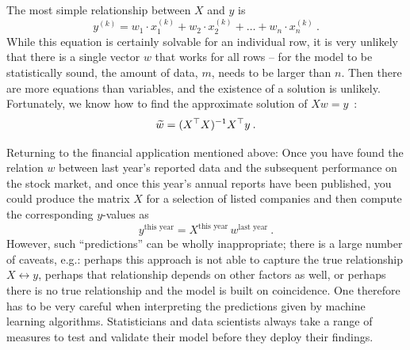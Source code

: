 \begin{application}
	The most simple relationship between $X$ and $y$ is
	\[ y^{(k)} = w_1 \cdot x_1^{(k)} + w_2 \cdot x_2^{(k)} + \dots + w_n \cdot x_n^{(k)} \:. \]
	While this equation is certainly solvable for an individual row, it is very unlikely that there is a single vector $w$ that works for all rows -- for the model to be statistically sound, the amount of data, $m$, needs to be larger than $n$. Then there are more equations than variables, and the existence of a solution is unlikely. Fortunately, we know how to find the approximate solution of $Xw=y$~: 
	\[ \widetilde{w} = (X^\top X)^{-1} X^\top y \:. \]
		
	Returning to the financial application mentioned above: Once you have found the relation $w$ between last year's reported data and the subsequent performance on the stock market, and once this year's annual reports have been published, you could produce the matrix $X$ for a selection of listed companies and then compute the corresponding $y$-values as
	\[ y^{\text{this year}} = X^{\text{this year}} \, w^{\text{last year}} \:. \]
	However, such ``predictions'' can be wholly inappropriate; there is a large number of caveats, e.g.: perhaps this approach is not able to capture the true relationship $X \leftrightarrow y$, perhaps that relationship depends on other factors as well, or perhaps there is no true relationship and the model is built on coincidence. One therefore has to be very careful when interpreting the predictions given by machine learning algorithms. Statisticians and data scientists always take a range of measures to test and validate their model before they deploy their findings.
\end{application}

